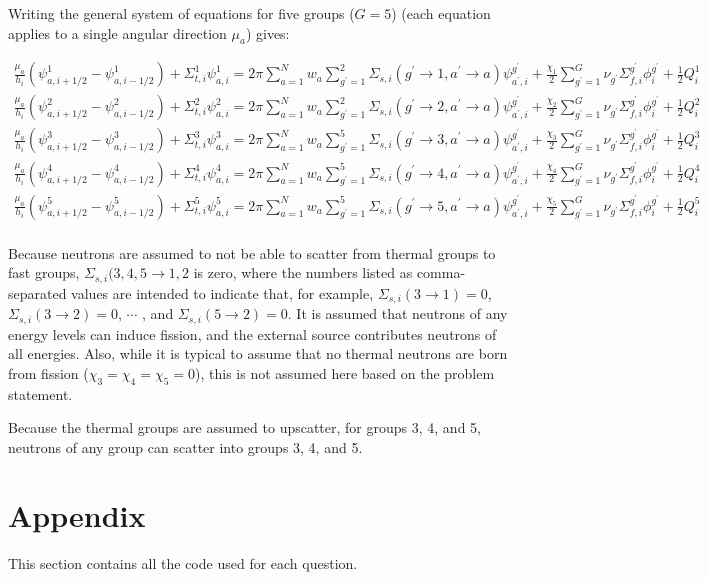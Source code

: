 \documentclass[10pt]{article}
\begin{document}
Writing the general system of equations for five groups (\(G=5\)) (each equation applies to a single angular direction \(\mu_a\)) gives:

\begin{equation}
\begin{aligned}
\frac{\mu_a}{h_i}\left(\psi_{a,i+1/2}^1-\psi_{a,i-1/2}^1\right)+\Sigma_{t,i}^1\psi_{a,i}^1=2\pi\sum_{a=1}^{N}w_a\sum_{g^{'}=1}^2\Sigma_{s,i}(g^{'}\rightarrow 1, a^{'}\rightarrow a)\psi_{a^{'},i}^{g^{'}}+\frac{\chi_1}{2}\sum_{g^{'}=1}^{G}\nu_{g^{'}}\Sigma_{f,i}^{g^{'}}\phi_{i}^{g^{'}}+\frac{1}{2}Q_i^1\\
\frac{\mu_a}{h_i}\left(\psi_{a,i+1/2}^2-\psi_{a,i-1/2}^2\right)+\Sigma_{t,i}^2\psi_{a,i}^2=2\pi\sum_{a=1}^{N}w_a\sum_{g^{'}=1}^2\Sigma_{s,i}(g^{'}\rightarrow 2, a^{'}\rightarrow a)\psi_{a^{'},i}^{g^{'}}+\frac{\chi_2}{2}\sum_{g^{'}=1}^{G}\nu_{g^{'}}\Sigma_{f,i}^{g^{'}}\phi_{i}^{g^{'}}+\frac{1}{2}Q_i^2\\
\frac{\mu_a}{h_i}\left(\psi_{a,i+1/2}^3-\psi_{a,i-1/2}^3\right)+\Sigma_{t,i}^3\psi_{a,i}^3=2\pi\sum_{a=1}^{N}w_a\sum_{g^{'}=1}^5\Sigma_{s,i}(g^{'}\rightarrow 3, a^{'}\rightarrow a)\psi_{a^{'},i}^{g^{'}}+\frac{\chi_3}{2}\sum_{g^{'}=1}^{G}\nu_{g^{'}}\Sigma_{f,i}^{g^{'}}\phi_{i}^{g^{'}}+\frac{1}{2}Q_i^3\\
\frac{\mu_a}{h_i}\left(\psi_{a,i+1/2}^4-\psi_{a,i-1/2}^4\right)+\Sigma_{t,i}^4\psi_{a,i}^4=2\pi\sum_{a=1}^{N}w_a\sum_{g^{'}=1}^5\Sigma_{s,i}(g^{'}\rightarrow 4, a^{'}\rightarrow a)\psi_{a^{'},i}^{g^{'}}+\frac{\chi_4}{2}\sum_{g^{'}=1}^{G}\nu_{g^{'}}\Sigma_{f,i}^{g^{'}}\phi_{i}^{g^{'}}+\frac{1}{2}Q_i^4\\
\frac{\mu_a}{h_i}\left(\psi_{a,i+1/2}^5-\psi_{a,i-1/2}^5\right)+\Sigma_{t,i}^5\psi_{a,i}^5=2\pi\sum_{a=1}^{N}w_a\sum_{g^{'}=1}^5\Sigma_{s,i}(g^{'}\rightarrow 5, a^{'}\rightarrow a)\psi_{a^{'},i}^{g^{'}}+\frac{\chi_5}{2}\sum_{g^{'}=1}^{G}\nu_{g^{'}}\Sigma_{f,i}^{g^{'}}\phi_{i}^{g^{'}}+\frac{1}{2}Q_i^5\\
\end{aligned}
\end{equation}

Because neutrons are assumed to not be able to scatter from thermal groups to fast groups, \(\Sigma_{s,i}(3,4,5\rightarrow 1,2\) is zero, where the numbers listed as comma-separated values are intended to indicate that, for example, \(\Sigma_{s,i}(3\rightarrow 1)=0\), \(\Sigma_{s,i}(3\rightarrow 2)=0\), \(\cdots\) , and \(\Sigma_{s,i}(5\rightarrow2)=0\). It is assumed that neutrons of any energy levels can induce fission, and the external source contributes neutrons of all energies. Also, while it is typical to assume that no thermal neutrons are born from fission (\(\chi_3=\chi_4=\chi_5=0\)), this is not assumed here based on the problem statement.

Because the thermal groups are assumed to upscatter, for groups 3, 4, and 5, neutrons of any group can scatter into groups 3, 4, and 5.

\section{Appendix}
This section contains all the code used for each question. 

%
\end{document}
